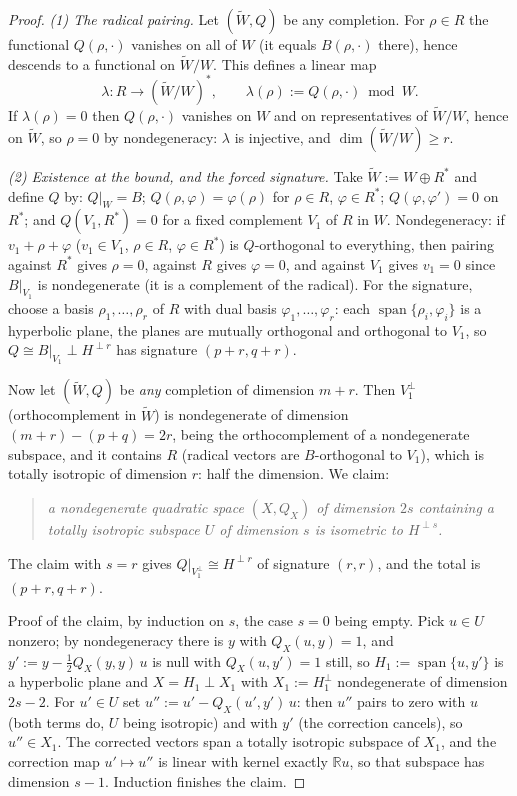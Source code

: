 \documentclass[11pt]{article}
\theoremstyle{definition}
\newcommand{\R}{\mathbb{R}}
\begin{document}
\begin{proof}
\emph{(1) The radical pairing.} Let $(\widetilde W, Q)$ be any completion. For $\rho \in R$ the functional $Q(\rho, \cdot)$ vanishes on all of $W$ (it equals $B(\rho, \cdot)$ there), hence descends to a functional on $\widetilde W / W$. This defines a linear map
\[
\lambda : R \longrightarrow (\widetilde W / W)^*, \qquad \lambda(\rho) := Q(\rho, \cdot) \bmod W .
\]
If $\lambda(\rho) = 0$ then $Q(\rho, \cdot)$ vanishes on $W$ and on representatives of $\widetilde W / W$, hence on $\widetilde W$, so $\rho = 0$ by nondegeneracy: $\lambda$ is injective, and $\dim(\widetilde W / W) \geq r$.

\emph{(2) Existence at the bound, and the forced signature.} Take $\widetilde W := W \oplus R^*$ and define $Q$ by: $Q|_W = B$; $Q(\rho, \varphi) = \varphi(\rho)$ for $\rho \in R$, $\varphi \in R^*$; $Q(\varphi, \varphi') = 0$ on $R^*$; and $Q(V_1, R^*) = 0$ for a fixed complement $V_1$ of $R$ in $W$. Nondegeneracy: if $v_1 + \rho + \varphi$ ($v_1 \in V_1$, $\rho \in R$, $\varphi \in R^*$) is $Q$-orthogonal to everything, then pairing against $R^*$ gives $\rho = 0$, against $R$ gives $\varphi = 0$, and against $V_1$ gives $v_1 = 0$ since $B|_{V_1}$ is nondegenerate (it is a complement of the radical). For the signature, choose a basis $\rho_1, \dots, \rho_r$ of $R$ with dual basis $\varphi_1, \dots, \varphi_r$: each $\operatorname{span}\{\rho_i, \varphi_i\}$ is a hyperbolic plane, the planes are mutually orthogonal and orthogonal to $V_1$, so $Q \cong B|_{V_1} \perp H^{\perp r}$ has signature $(p{+}r, q{+}r)$.

Now let $(\widetilde W, Q)$ be \emph{any} completion of dimension $m + r$. Then $V_1^{\perp}$ (orthocomplement in $\widetilde W$) is nondegenerate of dimension $(m{+}r) - (p{+}q) = 2r$, being the orthocomplement of a nondegenerate subspace, and it contains $R$ (radical vectors are $B$-orthogonal to $V_1$), which is totally isotropic of dimension $r$: half the dimension. We claim:
\begin{quote}
\emph{a nondegenerate quadratic space $(X, Q_X)$ of dimension $2s$ containing a totally isotropic subspace $U$ of dimension $s$ is isometric to $H^{\perp s}$.}
\end{quote}
The claim with $s = r$ gives $Q|_{V_1^\perp} \cong H^{\perp r}$ of signature $(r,r)$, and the total is $(p{+}r, q{+}r)$.

Proof of the claim, by induction on $s$, the case $s = 0$ being empty. Pick $u \in U$ nonzero; by nondegeneracy there is $y$ with $Q_X(u, y) = 1$, and $y' := y - \tfrac12 Q_X(y,y)\, u$ is null with $Q_X(u, y') = 1$ still, so $H_1 := \operatorname{span}\{u, y'\}$ is a hyperbolic plane and $X = H_1 \perp X_1$ with $X_1 := H_1^{\perp}$ nondegenerate of dimension $2s - 2$. For $u' \in U$ set $u'' := u' - Q_X(u', y')\, u$: then $u''$ pairs to zero with $u$ (both terms do, $U$ being isotropic) and with $y'$ (the correction cancels), so $u'' \in X_1$. The corrected vectors span a totally isotropic subspace of $X_1$, and the correction map $u' \mapsto u''$ is linear with kernel exactly $\R u$, so that subspace has dimension $s - 1$. Induction finishes the claim.


\end{proof}
\end{document}

